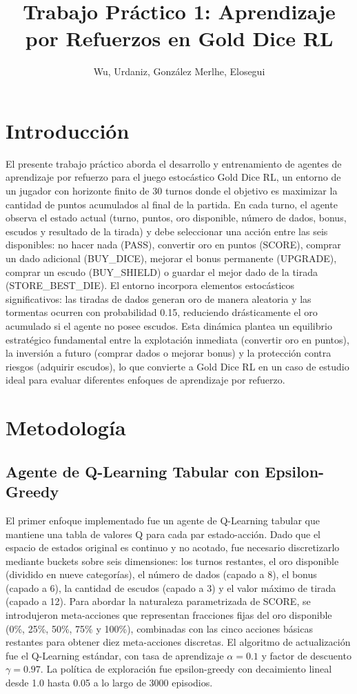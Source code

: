 \documentclass[12pt,a4paper]{article}
\title{\textbf{Trabajo Práctico 1: Aprendizaje por Refuerzos en Gold Dice RL}}
\author{Wu, Urdaniz, González Merlhe, Elosegui}
\begin{document}
\maketitle

\section{Introducción}

El presente trabajo práctico aborda el desarrollo y entrenamiento de agentes de aprendizaje por refuerzo para el juego estocástico Gold Dice RL, un entorno de un jugador con horizonte finito de 30 turnos donde el objetivo es maximizar la cantidad de puntos acumulados al final de la partida. En cada turno, el agente observa el estado actual (turno, puntos, oro disponible, número de dados, bonus, escudos y resultado de la tirada) y debe seleccionar una acción entre las seis disponibles: no hacer nada (PASS), convertir oro en puntos (SCORE), comprar un dado adicional (BUY\_DICE), mejorar el bonus permanente (UPGRADE), comprar un escudo (BUY\_SHIELD) o guardar el mejor dado de la tirada (STORE\_BEST\_DIE). El entorno incorpora elementos estocásticos significativos: las tiradas de dados generan oro de manera aleatoria y las tormentas ocurren con probabilidad 0.15, reduciendo drásticamente el oro acumulado si el agente no posee escudos. Esta dinámica plantea un equilibrio estratégico fundamental entre la explotación inmediata (convertir oro en puntos), la inversión a futuro (comprar dados o mejorar bonus) y la protección contra riesgos (adquirir escudos), lo que convierte a Gold Dice RL en un caso de estudio ideal para evaluar diferentes enfoques de aprendizaje por refuerzo.

\section{Metodología}

\subsection{Agente de Q-Learning Tabular con Epsilon-Greedy}

El primer enfoque implementado fue un agente de Q-Learning tabular que mantiene una tabla de valores Q para cada par estado-acción. Dado que el espacio de estados original es continuo y no acotado, fue necesario discretizarlo mediante buckets sobre seis dimensiones: los turnos restantes, el oro disponible (dividido en nueve categorías), el número de dados (capado a 8), el bonus (capado a 6), la cantidad de escudos (capado a 3) y el valor máximo de tirada (capado a 12). Para abordar la naturaleza parametrizada de SCORE, se introdujeron meta-acciones que representan fracciones fijas del oro disponible (0\%, 25\%, 50\%, 75\% y 100\%), combinadas con las cinco acciones básicas restantes para obtener diez meta-acciones discretas. El algoritmo de actualización fue el Q-Learning estándar, con tasa de aprendizaje $\alpha = 0.1$ y factor de descuento $\gamma = 0.97$. La política de exploración fue epsilon-greedy con decaimiento lineal desde 1.0 hasta 0.05 a lo largo de 3000 episodios.
\end{document}
